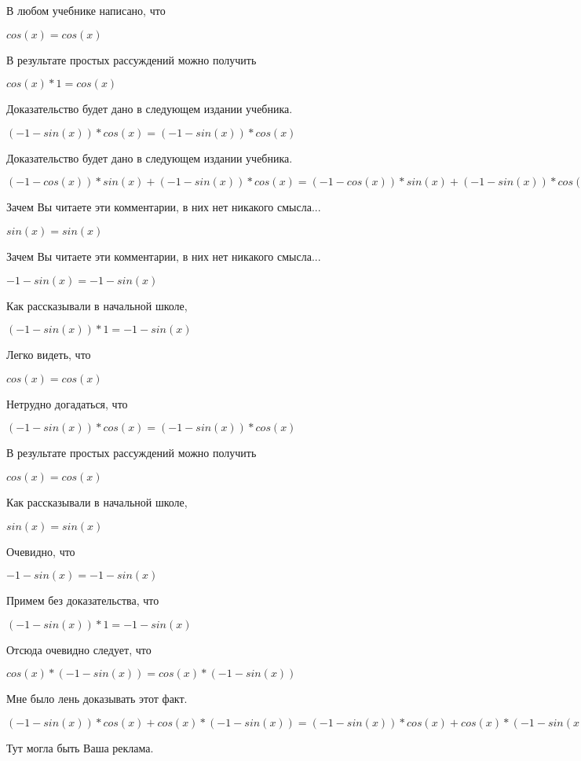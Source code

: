 \documentclass[12pt,a4paper,fleqn]{article}
\theoremstyle{definition}
\begin{document}
В любом учебнике написано, что 

$cos( x ) = cos( x )$

В результате простых рассуждений можно получить 

$cos( x ) *  1  = cos( x )$

Доказательство будет дано в следующем издании учебника. 

$( -1  - sin( x )) * cos( x ) = ( -1  - sin( x )) * cos( x )$

Доказательство будет дано в следующем издании учебника. 

$( -1  - cos( x )) * sin( x ) + ( -1  - sin( x )) * cos( x ) = ( -1  - cos( x )) * sin( x ) + ( -1  - sin( x )) * cos( x )$

Зачем Вы читаете эти комментарии, в них нет никакого смысла... 

$sin( x ) = sin( x )$

Зачем Вы читаете эти комментарии, в них нет никакого смысла... 

$ -1  - sin( x ) =  -1  - sin( x )$

Как рассказывали в начальной школе, 

$( -1  - sin( x )) *  1  =  -1  - sin( x )$

Легко видеть, что 

$cos( x ) = cos( x )$

Нетрудно догадаться, что 

$( -1  - sin( x )) * cos( x ) = ( -1  - sin( x )) * cos( x )$

В результате простых рассуждений можно получить 

$cos( x ) = cos( x )$

Как рассказывали в начальной школе, 

$sin( x ) = sin( x )$

Очевидно, что 

$ -1  - sin( x ) =  -1  - sin( x )$

Примем без доказательства, что 

$( -1  - sin( x )) *  1  =  -1  - sin( x )$

Отсюда очевидно следует, что 

$cos( x ) * ( -1  - sin( x )) = cos( x ) * ( -1  - sin( x ))$

Мне было лень доказывать этот факт.

$( -1  - sin( x )) * cos( x ) + cos( x ) * ( -1  - sin( x )) = ( -1  - sin( x )) * cos( x ) + cos( x ) * ( -1  - sin( x ))$

Тут могла быть Ваша реклама. 
\end{document}
